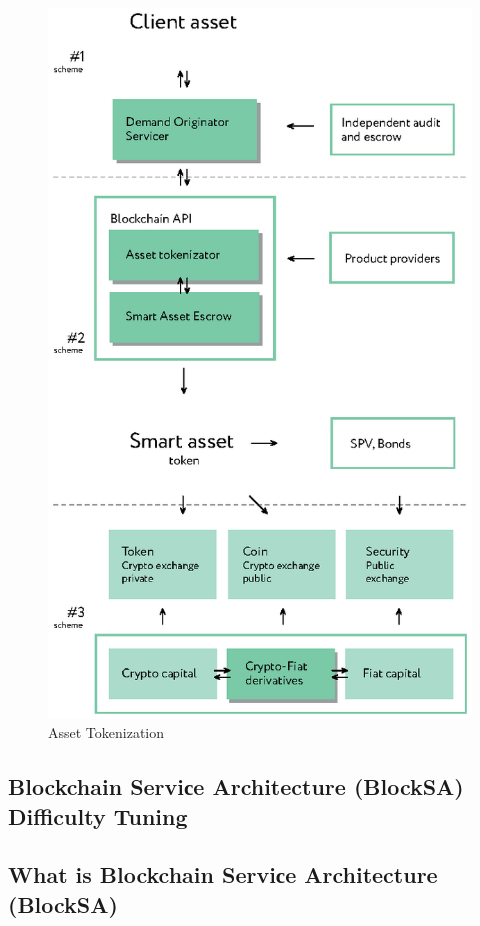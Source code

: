 \documentclass{article}
\begin{document}
\begin{multicols}{2}
\begin{figure}
  \centering
  \includegraphics[width=\columnwidth]{asset-tokenization.eps}
  \caption{Asset Tokenization}
  \label{fig:tokenization}
\end{figure}


\subsection{Blockchain Serviсe Architecture (BlockSA) Difficulty Tuning}

\subsection{What is Blockchain Serviсe Architecture (BlockSA)}


\end{multicols}
\end{document}
